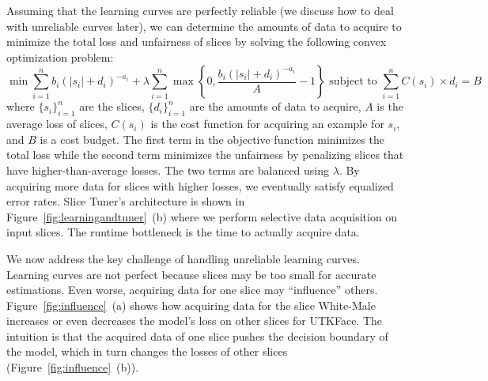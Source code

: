 \documentclass[11pt]{article}
\newcommand{\slicetuner}{Slice Tuner}
\begin{document}

Assuming that the learning curves are perfectly reliable (we discuss how to deal with unreliable curves later), we can determine the amounts of data to acquire to minimize the total loss and unfairness of slices by solving the following convex optimization problem:
\[\min \sum_{i=1}^n b_i(|s_i| + d_i)^{-a_i} + \lambda \sum_{i=1}^n \max \left\{0, \frac{b_i(|s_i| + d_i)^{-a_i}}{A} - 1 \right\} \textrm{\ subject to\ } \sum_{i=1}^n C(s_i) \times d_i = B
\]
where $\{s_i\}_{i=1}^n$ are the slices, $\{d_i\}_{i=1}^n$ are the amounts of data to acquire, $A$ is the average loss of slices, $C(s_i)$ is the cost function for acquiring an example for $s_i$, and $B$ is a cost budget. The first term in the objective function minimizes the total loss while the second term minimizes the unfairness by penalizing slices that have higher-than-average losses. The two terms are balanced using $\lambda$. By acquiring more data for slices with higher losses, we eventually satisfy equalized error rates. \slicetuner{}'s architecture is shown in Figure~\ref{fig:learningandtuner}~(b) where we perform selective data acquisition on input slices. The runtime bottleneck is the time to actually acquire data.

We now address the key challenge of handling unreliable learning curves. Learning curves are not perfect because slices may be too small for accurate estimations. Even worse, acquiring data for one slice may ``influence'' others. Figure~\ref{fig:influence}~(a) shows how acquiring data for the slice White-Male increases or even decreases the model's loss on other slices for UTKFace. The intuition is that the acquired data of one slice pushes the decision boundary of the model, which in turn changes the losses of other slices (Figure~\ref{fig:influence}~(b)).

\end{document}
